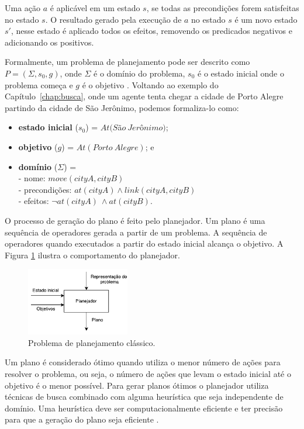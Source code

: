 Uma ação $a$ é aplicável em um estado $s$, se todas as precondições forem satisfeitas no estado $s$. O resultado gerado pela execução de $a$ no estado $s$ é um novo estado $s'$, nesse estado é aplicado todos os efeitos, removendo os predicados negativos e adicionando os positivos.

Formalmente, um problema de planejamento pode ser descrito como $P = (\Sigma, s_{0}, g)$, onde $\Sigma$ é o domínio do problema, $s_{0}$ é o estado inicial onde o problema começa e $g$ é o objetivo \cite{ghallab2004automated}. Voltando ao exemplo do Capítulo~\ref{chap:busca}, onde um agente tenta chegar a cidade de Porto Alegre partindo da cidade de São Jerônimo, podemos formaliza-lo como:

\begin{itemize}
	\item \textbf{estado inicial} ($s_{0}$) = $At(S$\~a$o~Jer$\^o$nimo)$;
	\item \textbf{objetivo} ($g$) = $At(Porto~Alegre)$; e
	\item \textbf{domínio} ($\Sigma$) = \\
	-	nome: $move(cityA, cityB)$\\
	-	precondições: $at(cityA) \wedge link(cityA, cityB)$\\
	-	efeitos: $\neg at(cityA)~ \wedge at(cityB)$.
\end{itemize}

O processo de geração do plano é feito pelo planejador. Um plano é uma sequência de operadores gerada a partir de um problema. A sequência de operadores quando executados a partir do estado inicial alcança o objetivo. A Figura \ref{fig:planmodelo} ilustra o comportamento do planejador.

\begin{figure}[ht]
	\centering
	\includegraphics[width=0.4\textwidth]{fig/modelo.pdf}
	\caption{Problema de planejamento clássico.}
	\label{fig:planmodelo}
\end{figure} 

Um plano é considerado ótimo quando utiliza o menor número de ações para resolver o problema, ou seja, o número de ações que levam o estado inicial até o objetivo é o menor possível. Para gerar planos ótimos o planejador utiliza técnicas de busca combinado com alguma heurística que seja independente de domínio. Uma heurística deve ser computacionalmente eficiente e ter precisão para que a geração do plano seja eficiente \cite{helmert2007flexible}. %


